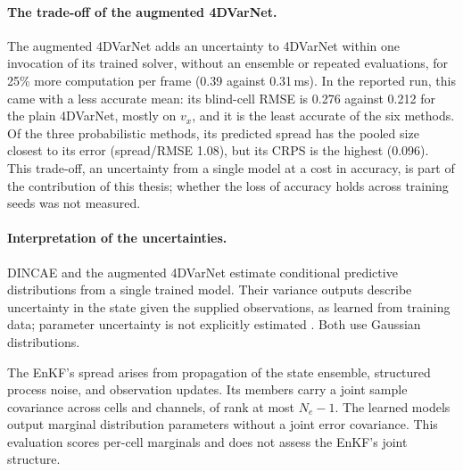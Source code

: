 \documentclass[english, 12pt, a4paper, elec, utf8, a-2b, online]{aaltothesis}
\begin{document}
\paragraph{The trade-off of the augmented 4DVarNet.}
The augmented 4DVarNet adds an uncertainty to 4DVarNet within one invocation
of its trained solver, without an ensemble or repeated evaluations, for 25\%
more computation per frame (0.39 against 0.31\,ms). In the reported run, this
came with a less accurate mean: its blind-cell RMSE is 0.276 against 0.212 for
the plain 4DVarNet, mostly on $v_x$, and it is the least accurate of the six
methods. Of the three probabilistic methods, its predicted spread has the
pooled size closest to its error (spread/RMSE 1.08), but its CRPS is the
highest (0.096). This trade-off, an uncertainty from a single model at a cost
in accuracy, is part of the contribution of this thesis; whether the loss of
accuracy holds across training seeds was not measured.

\paragraph{Interpretation of the uncertainties.}
DINCAE and the augmented 4DVarNet estimate conditional predictive distributions
from a single trained model. Their variance outputs describe uncertainty in
the state given the supplied observations, as learned from training data;
parameter uncertainty is not explicitly estimated
\cite{kendall2017uncertainties}. Both use Gaussian distributions.

The EnKF's spread arises from propagation of the state ensemble, structured process
noise, and observation updates. Its members carry a joint sample covariance
across cells and channels, of rank at most $N_e-1$. The learned models output
marginal distribution parameters without a joint error covariance. This
evaluation scores per-cell marginals and does not assess the EnKF's joint
structure.
\end{document}
